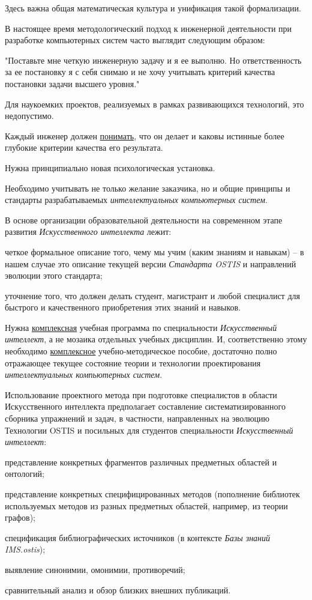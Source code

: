 \begin{SCn}
{Здесь важна общая математическая культура и унификация такой формализации.

В настоящее время методологический подход к инженерной деятельности при разработке компьютерных систем часто выглядит следующим образом:

"Поставьте мне четкую инженерную задачу и я ее выполню. Но ответственность за ее постановку я с себя снимаю и не хочу учитывать критерий качества постановки задачи высшего уровня."{}

Для наукоемких проектов, реализуемых в рамках развивающихся технологий, это недопустимо.

Каждый инженер должен \uline{понимать}, что он делает и каковы истинные более глубокие критерии качества его результата.

Нужна принципиально новая психологическая установка.

Необходимо учитывать не только желание заказчика, но и общие принципы и стандарты разрабатываемых \textit{интеллектуальных компьютерных систем}.

В основе организации образовательной деятельности на современном этапе развития \textit{Искусственного интеллекта} лежит:
\begin{scnitemize}
	\item четкое формальное описание того, чему мы учим (каким знаниям и навыкам) -- в нашем случае это описание текущей версии \textit{Стандарта OSTIS} и направлений эволюции этого стандарта;
	\item уточнение того, что должен делать студент, магистрант и любой специалист для быстрого и качественного приобретения этих знаний и навыков.
\end{scnitemize}

Нужна \uline{комплексная} учебная программа по специальности \textit{Искусственный интеллект}, а не мозаика отдельных учебных дисциплин. И, соответственно этому необходимо \uline{комплексное} учебно-методическое пособие, достаточно полно отражающее текущее состояние теории и технологии проектирования \textit{интеллектуальных компьютерных систем}.

Использование проектного метода при подготовке специалистов в области Искусственного интеллекта предполагает составление систематизированного сборника упражнений и задач, в частности, направленных на эволюцию Технологии OSTIS и посильных для студентов специальности \textit{Искусственный интеллект}:
\begin{scnitemize}
	\item представление конкретных фрагментов различных предметных областей и онтологий;	
	\item представление конкретных специфицированных методов (пополнение библиотек используемых методов из разных предметных областей, например, из теории графов);
	\item спецификация библиографических источников (в контексте \textit{Базы знаний IMS.ostis});
	\item выявление синонимии, омонимии, противоречий;
	\item сравнительный анализ и обзор близких внешних публикаций.
\end{scnitemize}

}
\end{SCn}
